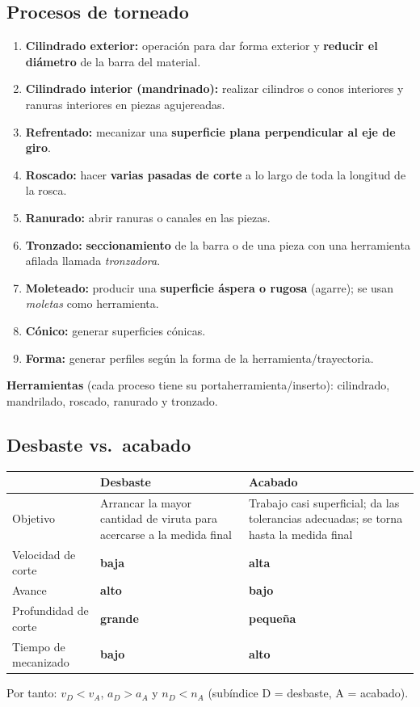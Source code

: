 \documentclass[12pt,a4paper]{article}
\begin{document}
\subsection{Procesos de torneado}
\begin{enumerate}
	\item \textbf{Cilindrado exterior:} operación para dar forma exterior y
	      \textbf{reducir el diámetro} de la barra del material.
	\item \textbf{Cilindrado interior (mandrinado):} realizar cilindros o conos
	      interiores y ranuras interiores en piezas agujereadas.
	\item \textbf{Refrentado:} mecanizar una \textbf{superficie plana
		      perpendicular al eje de giro}.
	\item \textbf{Roscado:} hacer \textbf{varias pasadas de corte} a lo largo de
	      toda la longitud de la rosca.
	\item \textbf{Ranurado:} abrir ranuras o canales en las piezas.
	\item \textbf{Tronzado:} \textbf{seccionamiento} de la barra o de una pieza
	      con una herramienta afilada llamada \emph{tronzadora}.
	\item \textbf{Moleteado:} producir una \textbf{superficie áspera o rugosa}
	      (agarre); se usan \emph{moletas} como herramienta.
	\item \textbf{Cónico:} generar superficies cónicas.
	\item \textbf{Forma:} generar perfiles según la forma de la
	      herramienta/trayectoria.
\end{enumerate}

\textbf{Herramientas} (cada proceso tiene su portaherramienta/inserto):
cilindrado, mandrilado, roscado, ranurado y tronzado.

\subsection{Desbaste vs.\ acabado}
\begin{center}
	\begin{tabularx}{\linewidth}{@{}lXX@{}}
		\toprule
		                     & \textbf{Desbaste}
		                     & \textbf{Acabado}
		\\
		\midrule
		Objetivo             & Arrancar la mayor cantidad de viruta para acercarse a
		la medida final
		                     & Trabajo casi superficial; da las tolerancias
		adecuadas; se torna hasta la
		medida final
		\\
		Velocidad de corte   & \textbf{baja}
		                     & \textbf{alta}
		\\
		Avance               & \textbf{alto}
		                     & \textbf{bajo}
		\\
		Profundidad de corte & \textbf{grande}
		                     & \textbf{pequeña}
		\\
		Tiempo de mecanizado & \textbf{bajo}
		                     & \textbf{alto}
		\\
		\bottomrule
	\end{tabularx}
\end{center}
Por tanto: $v_D < v_A$, $a_D > a_A$ y $n_D < n_A$ (subíndice D = desbaste, A =
acabado).
\end{document}
